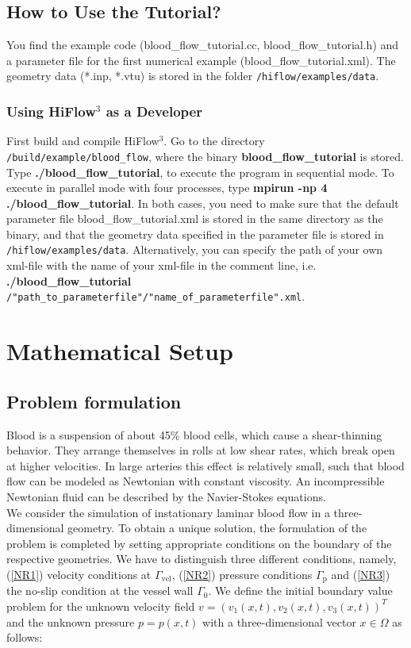 \documentclass[a4paper, 11pt, twoside]{article}
\begin{document}
\subsection{How to Use the Tutorial?}
You find the example code (blood\_flow\_tutorial.cc, blood\_flow\_tutorial.h) and a parameter file for the first numerical 
example (blood\_flow\_tutorial.xml).
The geometry data (*.inp, *.vtu) is stored in the folder \verb'/hiflow/examples/data'.

\subsubsection{Using HiFlow$^3$ as a Developer}\label{sectiondeveloper}
First build and compile HiFlow$^3$. Go to the directory \verb'/build/example/blood_flow', 
where the binary \textbf{blood\_flow\_tutorial} is stored. Type \textbf{./blood\_flow\_tutorial}, 
to execute the program in sequential mode. To execute in parallel mode  
with four processes, type \textbf{mpirun -np 4 ./blood\_flow\_tutorial}. 
In both cases, you need to make sure that the default parameter file blood\_flow\_tutorial.xml 
is stored in the same directory as the binary, and that the geometry data specified in the parameter file is stored 
in \verb'/hiflow/examples/data'. 
Alternatively, you can specify the path of your own xml-file with the name of your xml-file in the comment line,
i.e. \textbf{./blood\_flow\_tutorial} \verb'/"path_to_parameterfile"/"name_of_parameterfile".xml'.
\\

\section{Mathematical Setup}

\subsection{Problem formulation}\label{intro}
Blood is a suspension of about 45\% blood cells, which cause a shear-thinning behavior. 
They arrange themselves in rolls at low shear rates, which break
open at higher velocities. In large arteries this effect is relatively
small, such that blood flow can be modeled as Newtonian with constant
viscosity. An incompressible Newtonian fluid can be described by the
Navier-Stokes equations.\\

We consider the simulation of instationary laminar blood flow in a three-dimensional geometry. 
To obtain a unique solution, the formulation of the problem is completed by setting appropriate
conditions on the boundary of the respective geometries. We have to distinguish three different conditions, namely, 
(\ref{NR1}) velocity conditions at  $\Gamma_{\text{vel}}$, 
(\ref{NR2}) pressure conditions $\Gamma_{\text{p}}$
and (\ref{NR3}) the no-slip condition
at the vessel wall $\Gamma_0$.
We define the initial boundary value problem for the unknown velocity field $v = (v_1(x,t), v_2(x,t), v_3(x,t))^T$ 
and the unknown pressure $p = p(x,t)$ with a three-dimensional vector $x \in \Omega$ as follows:
\end{document}
